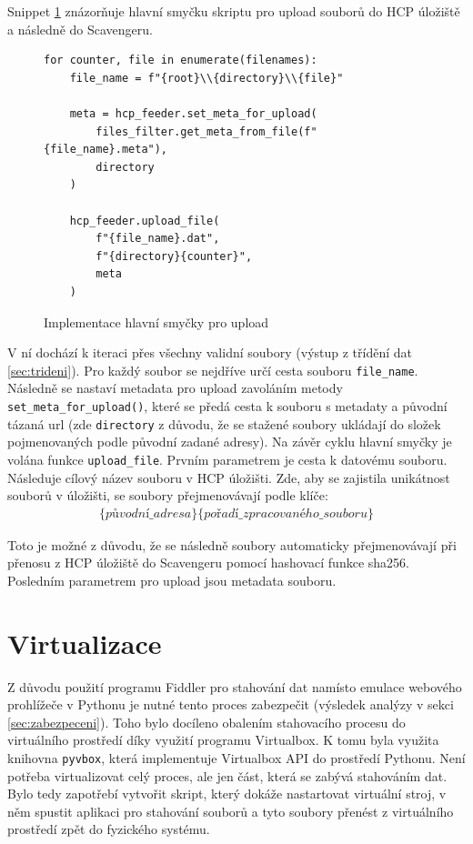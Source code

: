\documentclass[thesis=M,czech,hidelinks]{FITthesis}[2013/05/06]
\begin{document}
Snippet \ref{snip:mainupload} znázorňuje hlavní smyčku skriptu pro upload souborů do HCP úložiště a následně do Scavengeru.
\begin{figure}[h]               
	\begin{verbatim}
for counter, file in enumerate(filenames):
    file_name = f"{root}\\{directory}\\{file}"

    meta = hcp_feeder.set_meta_for_upload(
        files_filter.get_meta_from_file(f"{file_name}.meta"),
        directory
    )

    hcp_feeder.upload_file(
        f"{file_name}.dat",
        f"{directory}{counter}",
        meta
    )
	\end{verbatim}      
	\caption{Implementace hlavní smyčky pro upload}
	\label{snip:mainupload}
\end{figure}
V ní dochází k iteraci přes všechny validní soubory (výstup z třídění dat \ref{sec:trideni}). Pro každý soubor se nejdříve určí cesta souboru \texttt{file_name}. Následně se nastaví metadata pro upload zavoláním metody \texttt{set_meta_for_upload()}, které se předá cesta k souboru s metadaty a původní tázaná url (zde \texttt{directory} z důvodu, že se stažené soubory ukládají do složek pojmenovaných podle původní zadané adresy). Na závěr cyklu hlavní smyčky je volána funkce \texttt{upload_file}. Prvním parametrem je cesta k datovému souboru. Následuje cílový název souboru v HCP úložišti. Zde, aby se zajistila unikátnost souborů v úložišti, se soubory přejmenovávají podle klíče:
\begin{eqnarray}
\{původní\_ adresa\}\{pořadí\_ zpracovaného\_ souboru\}
\end{eqnarray}

 Toto je možné z důvodu, že se následně soubory automaticky přejmenovávají při přenosu z HCP úložiště do Scavengeru pomocí hashovací funkce sha256. Posledním parametrem pro upload jsou metadata souboru.

\section{Virtualizace}
Z důvodu použití programu Fiddler pro stahování dat namísto emulace webového prohlížeče v Pythonu je nutné tento proces zabezpečit (výsledek analýzy v sekci \ref{sec:zabezpeceni}). Toho bylo docíleno obalením stahovacího procesu do virtuálního prostředí díky využití programu Virtualbox. K tomu byla využita knihovna \texttt{pyvbox}\cite{pyvbox}, která implementuje Virtualbox API do prostředí Pythonu. Není potřeba virtualizovat celý proces, ale jen část, která se zabývá stahováním dat. Bylo tedy zapotřebí vytvořit skript, který dokáže nastartovat virtuální stroj, v něm spustit aplikaci pro stahování souborů a tyto soubory přenést z virtuálního prostředí zpět do fyzického systému.
\end{document}
